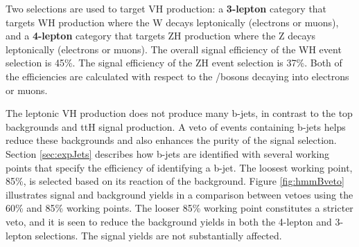 Two selections are used to target VH production: a \textbf{3-lepton} category that targets WH production where the W decays leptonically (electrons or muons), and a \textbf{4-lepton} category that targets ZH production where the Z decays leptonically (electrons or muons).
The overall signal efficiency of the WH event selection is 45\%.
The signal efficiency of the ZH event selection is 37\%.
Both of the efficiencies are calculated with respect to the \W/\Z bosons decaying into electrons or muons.

The leptonic VH production does not produce many b-jets, in contrast to the top backgrounds and ttH signal production.
A veto of events containing b-jets helps reduce these backgrounds and also enhances the purity of the signal selection.
Section \ref{sec:expJets} describes how b-jets are identified with several working points that specify the efficiency of identifying a b-jet.
The loosest working point, 85\%, is selected based on its reaction of the background.
Figure \ref{fig:hmmBveto} illustrates signal and background yields in a comparison between vetoes using the 60\% and 85\% working points.
The looser 85\% working point constitutes a stricter veto, and it is seen to reduce the background yields in both the 4-lepton and 3-lepton selections.
The signal yields are not substantially affected.



